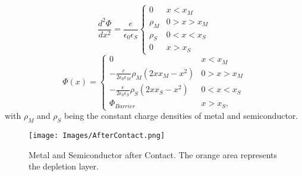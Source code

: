 \documentclass[12pt]{article}
\begin{document}
\begin{equation}
\frac{d^2 \Phi}{dx^2} = \frac{e}{\epsilon _0 \epsilon _S}
\begin{cases}
0		 			 & \text{$x < x_M$} \\ 
\rho _M		 & \text{$0 > x > x_M$} \\   
\rho _S    & \text{$0 < x < x_S$} \\ 
0		 			 & \text{$x > x_S$}
\end{cases}
\end{equation}
\begin{equation}
\Phi (x) =
\begin{cases}
0			 																														& \text{$x < x_M$} \\ 
- \frac{e}{2 \epsilon _0 \epsilon _M} \rho _M (2xx_M - x^2 )		 	& \text{$0 > x > x_M$} \\
- \frac{e}{2 \epsilon _0 \epsilon _S} \rho _S (2xx_S - x^2 )     	& \text{$0 < x < x_S$} \\ 
\Phi_{Barrier} 			  																												& \text{$x > x_S$},
\end{cases}
\end{equation}
with $\rho _M$ and $\rho _S$ being the constant charge densities of metal and semiconductor\cite{Fundamentals}.

\begin{figure}[htb]
	\centering
		\texttt{[image: Images/AfterContact.png]}
	\caption{Metal and Semiconductor after Contact. The orange area represents the depletion layer.}
	\label{fig:AfterContact}
\end{figure}
\end{document}
